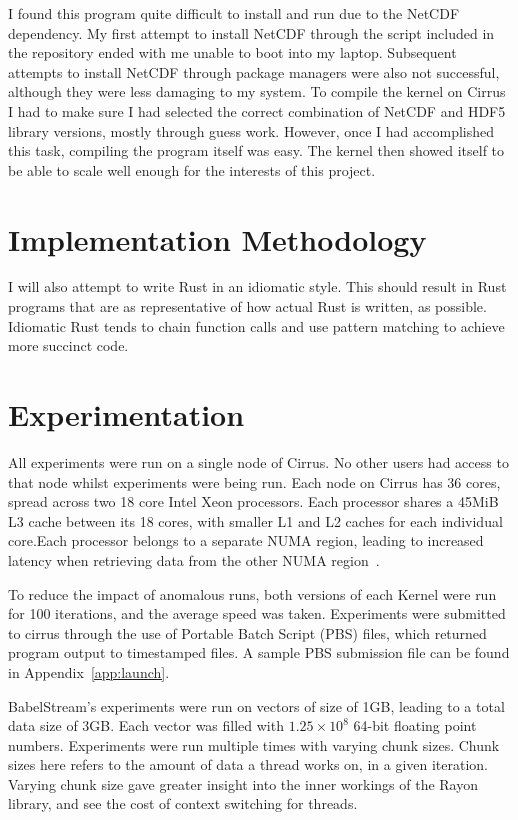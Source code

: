 I found this program quite difficult to install and run due to the NetCDF dependency. My first attempt to install NetCDF through the script included in the repository ended with me unable to boot into my laptop. Subsequent attempts to install NetCDF through package managers were also not successful, although they were less damaging to my system. To compile the kernel on Cirrus I had to make sure I had selected the correct combination of NetCDF and HDF5 library versions, mostly through guess work. However, once I had accomplished this task, compiling the program itself was easy. The kernel then showed itself to be able to scale well enough for the interests of this project.

\section{Implementation Methodology}
I will also attempt to write Rust in an idiomatic style. This should result in Rust programs that are as representative of how actual Rust is written, as possible. Idiomatic Rust tends to chain function calls and use pattern matching to achieve more succinct code.


\section{Experimentation}
All experiments were run on a single node of Cirrus. No other users had access to that node whilst experiments were being run. Each node on Cirrus has 36 cores, spread across two 18 core Intel Xeon processors. Each processor shares a 45MiB L3 cache between its 18 cores, with smaller L1 and L2 caches for each individual core.Each processor belongs to a separate NUMA region, leading to increased latency when retrieving data from the other NUMA region~\cite{CirrusHardware}.

To reduce the impact of anomalous runs, both versions of each Kernel were run for 100 iterations, and the average speed was taken. Experiments were submitted to cirrus through the use of Portable Batch Script (PBS) files, which returned program output to timestamped files. A sample PBS submission file can be found in Appendix~\ref{app:launch}.

BabelStream's experiments were run on vectors of size of 1GB, leading to a total data size of 3GB. Each vector was filled with $1.25\times10^8$ 64-bit floating point numbers. Experiments were run multiple times with varying chunk sizes. Chunk sizes here refers to the amount of data a thread works on, in a given iteration. Varying chunk size gave greater insight into the inner workings of the Rayon library, and see the cost of context switching for threads.

